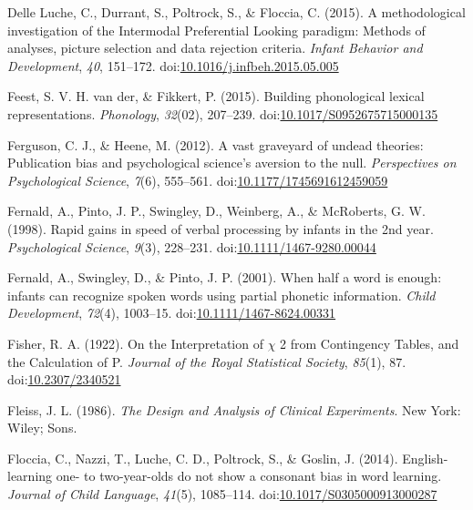 \documentclass[man]{apa6}
\begin{document}
\leavevmode\hypertarget{ref-DelleLuche2015}{}%
Delle Luche, C., Durrant, S., Poltrock, S., \& Floccia, C. (2015). A methodological investigation of the Intermodal Preferential Looking paradigm: Methods of analyses, picture selection and data rejection criteria. \emph{Infant Behavior and Development}, \emph{40}, 151--172. doi:\href{https://doi.org/10.1016/j.infbeh.2015.05.005}{10.1016/j.infbeh.2015.05.005}

\leavevmode\hypertarget{ref-vanderFeest2015}{}%
Feest, S. V. H. van der, \& Fikkert, P. (2015). Building phonological lexical representations. \emph{Phonology}, \emph{32}(02), 207--239. doi:\href{https://doi.org/10.1017/S0952675715000135}{10.1017/S0952675715000135}

\leavevmode\hypertarget{ref-Ferguson2012}{}%
Ferguson, C. J., \& Heene, M. (2012). A vast graveyard of undead theories: Publication bias and psychological science's aversion to the null. \emph{Perspectives on Psychological Science}, \emph{7}(6), 555--561. doi:\href{https://doi.org/10.1177/1745691612459059}{10.1177/1745691612459059}

\leavevmode\hypertarget{ref-Fernald1998}{}%
Fernald, A., Pinto, J. P., Swingley, D., Weinberg, A., \& McRoberts, G. W. (1998). Rapid gains in speed of verbal processing by infants in the 2nd year. \emph{Psychological Science}, \emph{9}(3), 228--231. doi:\href{https://doi.org/10.1111/1467-9280.00044}{10.1111/1467-9280.00044}

\leavevmode\hypertarget{ref-Fernald2001a}{}%
Fernald, A., Swingley, D., \& Pinto, J. P. (2001). When half a word is enough: infants can recognize spoken words using partial phonetic information. \emph{Child Development}, \emph{72}(4), 1003--15. doi:\href{https://doi.org/10.1111/1467-8624.00331}{10.1111/1467-8624.00331}

\leavevmode\hypertarget{ref-Fisher1922}{}%
Fisher, R. A. (1922). On the Interpretation of \(\chi\) 2 from Contingency Tables, and the Calculation of P. \emph{Journal of the Royal Statistical Society}, \emph{85}(1), 87. doi:\href{https://doi.org/10.2307/2340521}{10.2307/2340521}

\leavevmode\hypertarget{ref-Fleiss1986}{}%
Fleiss, J. L. (1986). \emph{The Design and Analysis of Clinical Experiments}. New York: Wiley; Sons.

\leavevmode\hypertarget{ref-Floccia2014}{}%
Floccia, C., Nazzi, T., Luche, C. D., Poltrock, S., \& Goslin, J. (2014). English-learning one- to two-year-olds do not show a consonant bias in word learning. \emph{Journal of Child Language}, \emph{41}(5), 1085--114. doi:\href{https://doi.org/10.1017/S0305000913000287}{10.1017/S0305000913000287}
\end{document}
